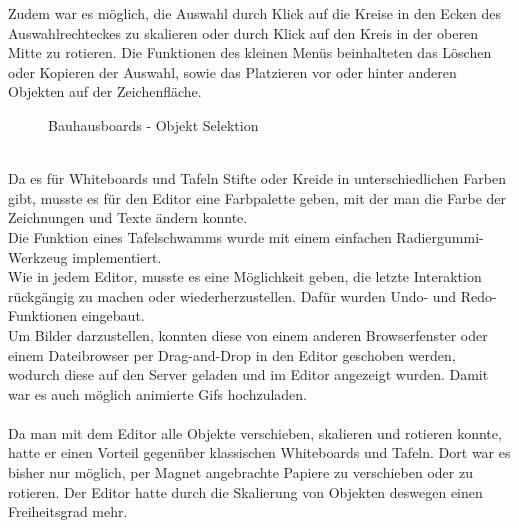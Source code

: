 Zudem war es möglich, die Auswahl durch Klick auf die Kreise in den Ecken des Auswahlrechteckes zu skalieren oder durch Klick auf den Kreis in der oberen Mitte zu rotieren.
Die Funktionen des kleinen Menüs beinhalteten das Löschen oder Kopieren der Auswahl, sowie das Platzieren vor oder hinter anderen Objekten auf der Zeichenfläche.
\begin{figure}
  \centering
  \caption{Bauhausboards - Objekt Selektion}
  \label{img:editorObjectSelection}
\end{figure}
\\
Da es für Whiteboards und Tafeln Stifte oder Kreide in unterschiedlichen Farben gibt, musste es für den Editor eine Farbpalette geben, mit der man die Farbe der Zeichnungen und Texte ändern konnte.
\\
Die Funktion eines Tafelschwamms wurde mit einem einfachen Radiergummi-Werkzeug implementiert.
\\
Wie in jedem Editor, musste es eine Möglichkeit geben, die letzte Interaktion rückgängig zu machen oder wiederherzustellen. Dafür wurden Undo- und Redo-Funktionen eingebaut.
\\
Um Bilder darzustellen, konnten diese von einem anderen Browserfenster oder einem Dateibrowser per Drag-and-Drop in den Editor geschoben werden, wodurch diese auf den Server geladen und im Editor angezeigt wurden.
Damit war es auch möglich animierte Gifs hochzuladen.
\\
\\
Da man mit dem Editor alle Objekte verschieben, skalieren und rotieren konnte, hatte er einen Vorteil gegenüber klassischen Whiteboards und Tafeln.
Dort war es bisher nur möglich, per Magnet angebrachte Papiere zu verschieben oder zu rotieren.
Der Editor hatte durch die Skalierung von Objekten deswegen einen Freiheitsgrad mehr.
